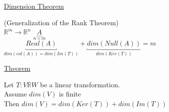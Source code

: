 \documentclass[12pt]{article}
\newcommand{\real}[0]{\mathbb{R}}
\newenvironment{block}[1][Label]{\underline{#1}\par}{}
\newenvironment{theorem}{\block[Theorem]}{\endblock}
\newcommand{\uu}[1]{\underbracket{#1}}
\begin{document}
\begin{block}[Dimension Theorem]
	(Generalization of the Rank Theorem) \\
	$\real^m \rightarrow \real^n$ \qquad $\uu{A}_{n \times m}$ \\
	$\uu{Real(A)}_{dim(col(A)) = dim(Im(T))} + \uu{dim(Null(A))}_{dim(Ker(T))} = m$
	
	\begin{theorem}
		Let $T: V \real W$ be a linear transformation. \\
		Assume $dim(V)$ is finite \\
		Then $dim(V) = dim(Ker(T)) + dim(Im(T))$
	\end{theorem}
\end{block}
\end{document}

